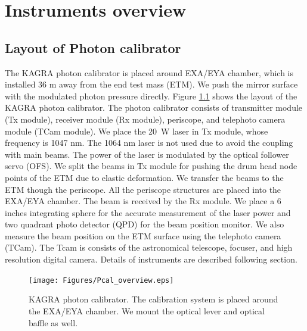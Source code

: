 
\chapter{Instruments overview} %

\label{Chapter3} %




\section{Layout of Photon calibrator}
The KAGRA photon calibrator is placed around EXA/EYA chamber, which is installed 36 m away from the end test mass (ETM). We push the mirror surface with the modulated photon pressure directly. Figure \ref{fig:Pcal_overview} shows the layout of the KAGRA photon calibrator. The photon calibrator consists of transmitter module (Tx module), receiver module (Rx module), periscope, and telephoto camera module (TCam module). We place the 20~W laser in Tx module, whose frequency is 1047 nm. The 1064 nm laser is not used due to avoid the coupling with main beams.   The power of the laser is modulated by the optical follower servo (OFS). We split the beams in Tx module for pushing the drum head node points of the ETM due to elastic deformation. We transfer the beams to the ETM though the periscope. All the periscope structures are placed into the EXA/EYA chamber. The beam is received by the Rx module. We place a 6 inches integrating sphere for the accurate measurement of the laser power and two quadrant photo detector (QPD) for the beam position monitor. We also measure the beam position on the ETM surface using the telephoto camera (TCam). The Tcam is consists of the astronomical telescope, focuser, and high resolution digital camera.  Details of instruments are described following section.
\begin{figure}
\begin{center}
\texttt{[image: Figures/Pcal\_overview.eps]}
\caption{KAGRA photon calibrator. The calibration system is placed around the EXA/EYA chamber. We mount the optical lever and optical baffle as well.} 
\label{fig:Pcal_overview} 
\end{center}
\end{figure}


